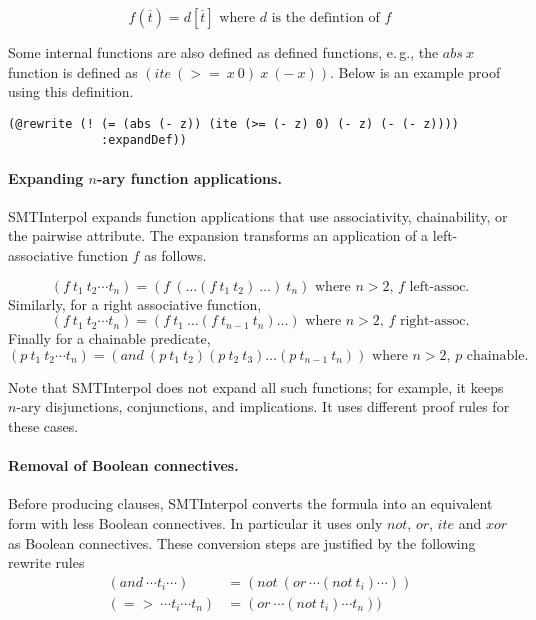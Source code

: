 \documentclass[a4paper]{article}
\newcommand\si{SMTInterpol\xspace}
\begin{document}
\begin{equation}
f(\overline{t}) = d[\overline{t}]
\text{ where $d$ is the defintion of $f$} \tag{expandDef}
\end{equation}

Some internal functions are also defined as defined functions,
e.\,g., the $abs\ x$ function is defined as $(ite\ (>=\ x\ 0)\ x\ (-\ x))$. Below is an example proof using this definition.
\begin{verbatim}
(@rewrite (! (= (abs (- z)) (ite (>= (- z) 0) (- z) (- (- z))))
             :expandDef))
\end{verbatim}

\paragraph{Expanding $n$-ary function applications.}  \si expands function
applications that use associativity, chainability, or the pairwise attribute.
The expansion transforms an application of a left-associative function $f$ as follows.

\begin{equation*}
  (f\ t_1\ t_2 \cdots t_n) = (f\ (\ldots (f\ t_1\ t_2)\ \ldots)\ t_n)
  \text{ where $n > 2$, $f$ left-assoc.}
  \tag{expand}
\end{equation*}
Similarly, for a right associative function,
\begin{equation*}
  (f\ t_1\ t_2 \cdots t_n) = (f\ t_1\ \ldots (f\ t_{n-1}\ t_n)\ldots)
  \text{ where $n > 2$, $f$ right-assoc.}
  \tag{expand}
\end{equation*}
Finally for a chainable predicate,
\begin{equation*}
  (p\ t_1\ t_2 \cdots t_n) = (and\ (p\ t_1\ t_2) (p\ t_2\ t_3) \ldots (p\ t_{n-1}\ t_n))
  \text{ where $n > 2$, $p$ chainable.}
  \tag{expand}
\end{equation*}

Note that \si does not expand all such functions; for example, it
keeps $n$-ary disjunctions, conjunctions, and implications.  It uses
different proof rules for these cases.

\paragraph{Removal of Boolean connectives.}  Before producing clauses, \si
converts the formula into an equivalent form with less Boolean connectives.
In particular it uses only $not$, $or$, $ite$ and $xor$ as Boolean connectives.
These conversion steps are justified by the following rewrite rules
\begin{align}
  (and\ \cdots t_i\cdots) &=
  (not\ (or\ \cdots (not\ t_i)\cdots))
  \tag{andToOr}\\
  (=>\ \cdots t_i\cdots t_n) &=
  (or\ \cdots (not\ t_i)\cdots t_n))
  \tag{impToOr}
\end{align}
\end{document}

